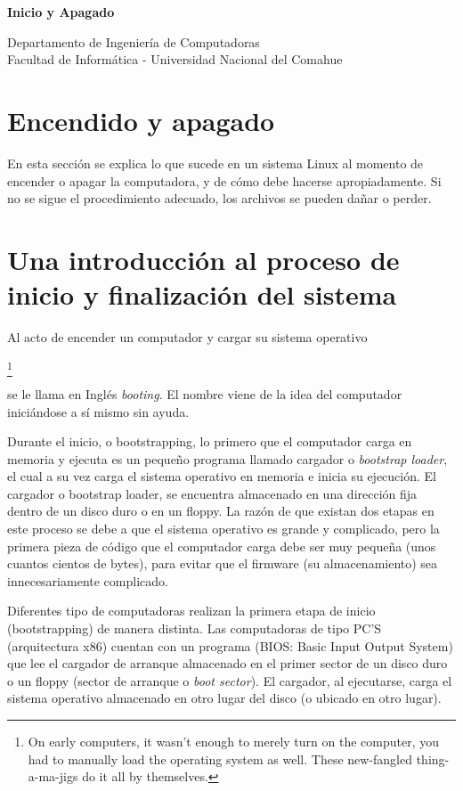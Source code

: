 \documentclass[12pt]{article}
\def\maketitle{%
 \makeatletter
 {\color{bl} \centering \huge \sc \textbf{
 Inicio y Apagado \\ 
 \vspace*{8pt} }\par}
 \makeatother


 \makeatletter
 {\centering \small 
 	Departamento de Ingeniería de Computadoras \\
 	Facultad de Informática - Universidad Nacional del Comahue \\
 	\vspace{20pt} }
 \makeatother

  }
\begin{document}
\thispagestyle{empty}
\maketitle
\setlength{\parindent}{0pt}



\section{Encendido y apagado}


 En esta sección se explica lo que sucede en un sistema Linux al momento
de encender o apagar la computadora, y de cómo debe hacerse apropiadamente. Si
no se sigue el procedimiento adecuado, los archivos se pueden dañar o perder.


\section{ Una introducción al proceso de inicio y finalización del
sistema}

 Al acto de encender un computador y cargar su sistema operativo 


		\footnote{On early computers, it wasn't enough to merely
		turn on the computer, you had to manually load the operating
		system as well.  These new-fangled thing-a-ma-jigs do it all by
		themselves.}
		
	se le llama en Inglés \textit{booting}. El nombre viene de
	la idea del computador iniciándose a sí mismo sin ayuda.  

 Durante el inicio, o bootstrapping, lo primero que el computador carga en
memoria y ejecuta es un pequeño programa llamado cargador o \textit{bootstrap
loader}, el cual a su vez carga el sistema operativo en memoria e
inicia su ejecución. El cargador o bootstrap loader, se encuentra almacenado en
una dirección fija dentro de un disco duro o en un floppy. La razón de que
existan dos etapas en este proceso se debe a que el sistema operativo es grande
y complicado, pero la primera pieza de código que el computador carga debe ser
muy pequeña (unos cuantos cientos de bytes), para evitar que el firmware (su
almacenamiento) sea innecesariamente complicado.  

 Diferentes tipo de computadoras realizan la primera etapa de inicio
(bootstrapping) de manera distinta. Las computadoras de tipo PC'S (arquitectura
x86) cuentan con un programa (BIOS: Basic Input Output System) que lee el
cargador de arranque almacenado en el primer sector de un disco duro o un floppy
(sector de arranque o \textit{boot sector}). El cargador, al
ejecutarse, carga el sistema operativo almacenado en otro lugar del disco (o
ubicado en otro lugar).  
\end{document}
